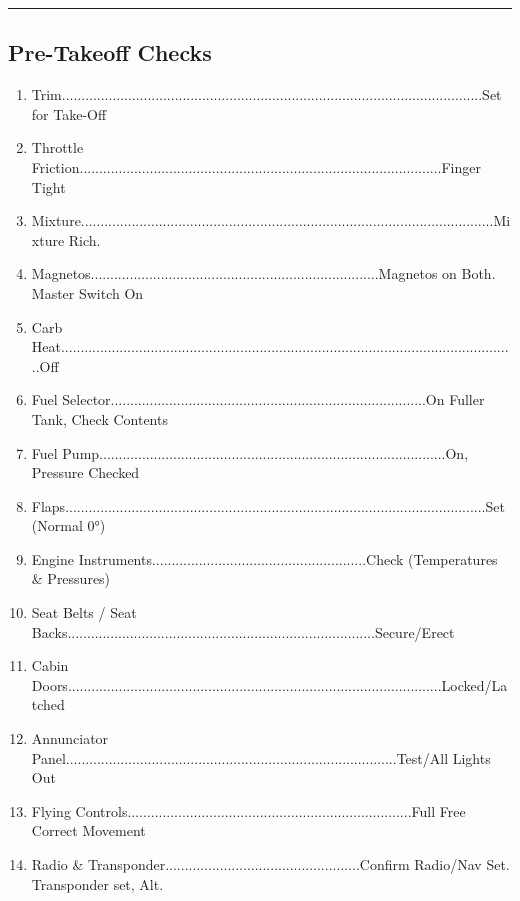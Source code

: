 \documentclass[a4paper]{article}
\newenvironment{numberedchecklist}{
  \begin{enumerate}[label=\arabic*., leftmargin=*, align=left]
    \setlength{\itemsep}{2pt}
    \setlength{\parskip}{0pt}
    \setlength{\parsep}{0pt}
}{
  \end{enumerate}
}
\begin{document}
\rule{\linewidth}{0.4pt}

\subsection*{Pre-Takeoff Checks}
\begin{numberedchecklist}
\item Trim............................................................................................................Set for Take-Off
\item Throttle Friction.............................................................................................Finger Tight
\item Mixture..........................................................................................................Mixture Rich.
\item Magnetos..........................................................................Magnetos on Both. Master Switch On
\item Carb Heat.....................................................................................................................Off
\item Fuel Selector.................................................................................On Fuller Tank, Check Contents
\item Fuel Pump.........................................................................................On, Pressure Checked
\item Flaps............................................................................................................Set (Normal 0°)
\item Engine Instruments.......................................................Check (Temperatures \& Pressures)
\item Seat Belts / Seat Backs...............................................................................Secure/Erect
\item Cabin Doors................................................................................................Locked/Latched
\item Annunciator Panel.....................................................................................Test/All Lights Out
\item Flying Controls.........................................................................Full Free Correct Movement
\item Radio \& Transponder..................................................Confirm Radio/Nav Set. Transponder set, Alt.

\end{numberedchecklist}
\end{document}

